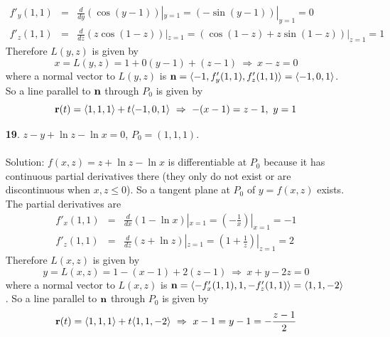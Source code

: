 \documentclass[12pt]{amsbook}
\newcommand{\la}{\langle}
\newcommand{\ra}{\rangle}
\begin{document}
\begin{enumerate}
\begin{eqnarray*}
f'_y(1,1)&=&\frac{d}{dy}(\cos(y-1))|_{y=1}=(-\sin(y-1))|_{y=1}=0\\
f'_z(1,1)&=&\frac{d}{dz}(z\cos(1-z))|_{z=1}=(\cos(1-z)+z\sin(1-z))|_{z=1}=1
\end{eqnarray*}
Therefore $L(y,z)$ is given by
$$x=L(y,z)=1+0(y-1)+(z-1) \ \Rightarrow \ x-z=0$$
where a normal vector to $L(y,z)$ is ${\bf n}=\la -1,f'_y(1,1),f'_z(1,1) \ra = \la -1,0,1 \ra$.
So a line parallel to ${\bf n}$ through $P_0$ is given by
$${\bf r}(t)=\la 1,1,1 \ra +t \la -1,0,1 \ra \ \Rightarrow \ -(x-1)=z-1, \ y=1$$
\item[{\small\bf 19}.] $z-y+\ln z-\ln x=0$, $P_0=(1,1,1)$.
\\
\\
{\sc Solution}: $f(x,z)=z+\ln z-\ln x$ is differentiable at $P_0$ because it has continuous partial derivatives there (they only do not exist or are discontinuous when $x,z\leq0$). So a tangent plane at $P_0$ of $y=f(x,z)$ exists. The partial derivatives are
\begin{eqnarray*}
f'_x(1,1)&=&\frac{d}{dx}(1-\ln x)|_{x=1}=(-\frac{1}{x})|_{x=1}=-1 \\
f'_z(1,1)&=&\frac{d}{dz}(z+\ln z)|_{z=1}=(1+\frac{1}{z})|_{z=1}=2
\end{eqnarray*}
Therefore $L(x,z)$ is given by
$$y=L(x,z)=1-(x-1)+2(z-1) \ \Rightarrow \ x+y-2z=0$$
where a normal vector to $L(x,z)$ is ${\bf n}=\la -f'_x(1,1),1,-f'_z(1,1) \ra = \la 1,1,-2 \ra$.
So a line parallel to ${\bf n}$ through $P_0$ is given by
$${\bf r}(t)=\la 1,1,1 \ra +t \la 1,1,-2 \ra \ \Rightarrow \ x-1=y-1=-\frac{z-1}{2}$$
\end{enumerate}
\end{document}
